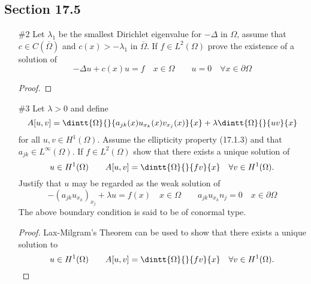 \documentclass[11pt, oneside]{article}
\begin{document}
\subsection*{Section 17.5}
\begin{enumerate}
  \item[\#2]
    Let $\lambda_1$ be the smallest Dirichlet eigenvalue for $-\Delta$ in
    $\Omega$, assume that $c \in C(\overline{\Omega})$ and $c(x) > -\lambda_1$
    in $\overline{\Omega}$.
    If $f \in L^2(\Omega)$ prove the existence of a solution of
    \[
      -\Delta u + c(x) u = f \quad x \in \Omega \qquad u = 0 \quad \forall x \in \partial \Omega
    \]

    \begin{proof}
      
    \end{proof}

  \pagebreak
  \item[\#3]
    Let $\lambda > 0$ and define
    \[
      A[u, v] = \dintt{\Omega}{}{a_{jk}(x)u_{x_k}(x) v_{x_j}(x)}{x} + \lambda \dintt{\Omega}{}{uv}{x}
    \]
    for all $u, v \in H^1(\Omega)$.
    Assume the ellipticity property (17.1.3) and that $a_{jk} \in L^{\infty}(\Omega)$.
    If $f \in L^2(\Omega)$ show that there exists a unique solution of
    \[
      u \in H^1(\Omega) \qquad A[u, v] = \dintt{\Omega}{}{fv}{x} \quad \forall v \in H^1(\Omega).
    \]
    Justify that $u$ may be regarded as the weak solution of
    \[
      -(a_{jk}u_{x_k})_{x_j} + \lambda u = f(x) \quad x \in \Omega \qquad a_{jk}u_{x_k}n_j = 0 \quad x \in \partial \Omega
    \]
    The above boundary condition is said to be of conormal type.

    \begin{proof}
      Lax-Milgram's Theorem can be used to show that there exists a unique solution to
      \[
        u \in H^1(\Omega) \qquad A[u, v] = \dintt{\Omega}{}{fv}{x} \quad \forall v \in H^1(\Omega).
      \]


\end{proof}
\end{enumerate}
\end{document}
